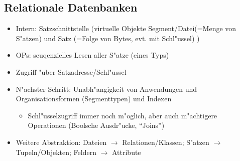 \documentclass[a4paper, 12pt]{scrartcl}
\begin{document}
\subsection{Relationale Datenbanken}
\begin{itemize}
	\item
		Intern: Satzschnittstelle (virtuelle Objekte Segment/Datei(=Menge von S"atzen) und Satz (=Folge von Bytes, evt. mit Schl"ussel) )
	\item
		OPs: seuqenzielles Lesen aller S"atze (eines Typs)
	\item
		Zugriff "uber Satzadresse/Schl"ussel
	\item
		N"achster Schritt: Unabh"angigkeit von Anwendungen und Organisationsformen (Segmenttypen) und Indexen
		\begin{itemize}
			\item
				Schl"usselzugriff immer noch m"oglich, aber auch m"achtigere Operationen (Boolsche Ausdr"ucke, \enquote{Joins})
		\end{itemize}
	\item
		Weitere Abstraktion: Dateien  $\rightarrow$ Relationen/Klassen; S"atzen $\rightarrow$ Tupeln/Objekten; Feldern $\rightarrow$ Attribute
\end{itemize}
\end{document}
